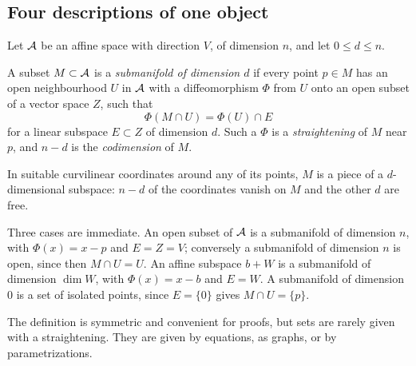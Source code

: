 \begin{notechapter}
\section{Four descriptions of one object}\label{submanifolds:sec:definition}

Let $\mathcal{A}$ be an affine space with direction $V$, of dimension $n$, and
let $0\leq d\leq n$.

\begin{definition}[Submanifold]\label{submanifolds:def:submanifold}
A subset $M\subset\mathcal{A}$ is a \emph{submanifold of dimension $d$} if every
point $p\in M$ has an open neighbourhood $U$ in $\mathcal{A}$ with a
diffeomorphism $\Phi$ from $U$ onto an open subset of a vector space $Z$,
such that
\[
  \Phi(M\cap U) = \Phi(U)\cap E
\]
for a linear subspace $E\subset Z$ of dimension $d$. Such a $\Phi$ is a
\emph{straightening} of $M$ near $p$, and $n - d$ is the
\emph{codimension} of $M$.
\end{definition}

\begin{intuition}
In suitable curvilinear coordinates around any of its points, $M$ is a
piece of a $d$-dimensional subspace: $n - d$ of the coordinates vanish on
$M$ and the other $d$ are free.
\end{intuition}

Three cases are immediate. An open subset of $\mathcal{A}$ is a submanifold of
dimension $n$, with $\Phi(x) = x - p$ and $E = Z = V$; conversely a
submanifold of dimension $n$ is open, since then $M\cap U = U$. An affine
subspace $b + W$ is a submanifold of dimension $\dim W$, with
$\Phi(x) = x - b$ and $E = W$. A submanifold of dimension $0$ is a set of
isolated points, since $E = \{0\}$ gives $M\cap U = \{p\}$.

The definition is symmetric and convenient for proofs, but sets are
rarely given with a straightening. They are given by equations, as
graphs, or by parametrizations.


\end{notechapter}
